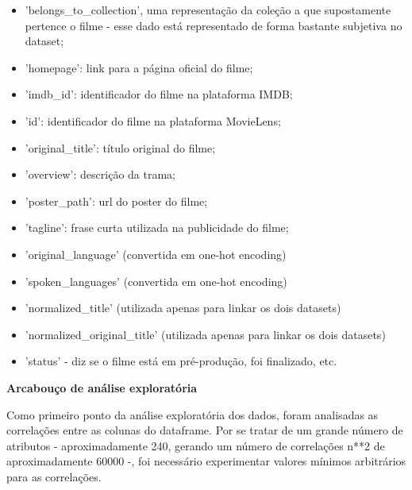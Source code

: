             \begin{itemize}
                \item 'belongs\_to\_collection', uma representação da coleção a que supostamente pertence o filme - esse dado está representado de forma bastante subjetiva no dataset;
                \item 'homepage': link para a página oficial do filme;
                \item 'imdb\_id': identificador do filme na plataforma IMDB;
                \item 'id': identificador do filme na plataforma MovieLens;
                \item 'original\_title': título original do filme;
                \item 'overview': descrição da trama;
                \item 'poster\_path': url do poster do filme;
                \item 'tagline': frase curta utilizada na publicidade do filme;
                \item 'original\_language' (convertida em one-hot encoding)
                \item 'spoken\_languages' (convertida em one-hot encoding)
                \item 'normalized\_title' (utilizada apenas para linkar os dois datasets)
                \item 'normalized\_original\_title' (utilizada apenas para linkar os dois datasets)
                \item 'status' - diz se o filme está em pré-produção, foi finalizado, etc.
            \end{itemize}

            \textbf{Arcabouço de análise exploratória}\par

            Como primeiro ponto da análise exploratória dos dados, foram analisadas as correlações entre as colunas do dataframe. Por se tratar de um grande número de atributos - aproximadamente 240, gerando um número de correlações n**2 de aproximadamente 60000 -, foi necessário experimentar valores mínimos arbitrários para as correlações.


